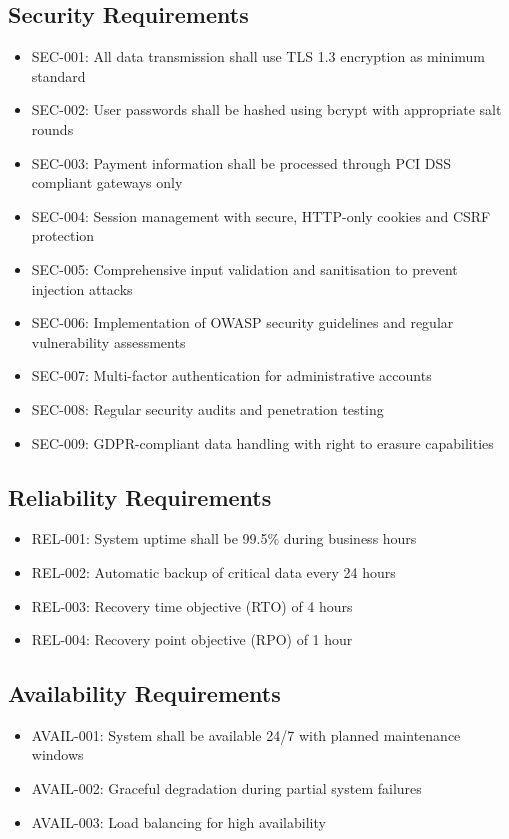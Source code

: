 \documentclass[11pt]{article}
\begin{document}
\subsection{Security Requirements}
\begin{itemize}
    \item SEC-001: All data transmission shall use TLS 1.3 encryption as minimum standard
    \item SEC-002: User passwords shall be hashed using bcrypt with appropriate salt rounds
    \item SEC-003: Payment information shall be processed through PCI DSS compliant gateways only
    \item SEC-004: Session management with secure, HTTP-only cookies and CSRF protection
    \item SEC-005: Comprehensive input validation and sanitisation to prevent injection attacks
    \item SEC-006: Implementation of OWASP security guidelines and regular vulnerability assessments
    \item SEC-007: Multi-factor authentication for administrative accounts
    \item SEC-008: Regular security audits and penetration testing
    \item SEC-009: GDPR-compliant data handling with right to erasure capabilities
\end{itemize}

\subsection{Reliability Requirements}
\begin{itemize}
    \item REL-001: System uptime shall be 99.5\% during business hours
    \item REL-002: Automatic backup of critical data every 24 hours
    \item REL-003: Recovery time objective (RTO) of 4 hours
    \item REL-004: Recovery point objective (RPO) of 1 hour
\end{itemize}

\subsection{Availability Requirements}
\begin{itemize}
    \item AVAIL-001: System shall be available 24/7 with planned maintenance windows
    \item AVAIL-002: Graceful degradation during partial system failures
    \item AVAIL-003: Load balancing for high availability
\end{itemize}
\end{document}
